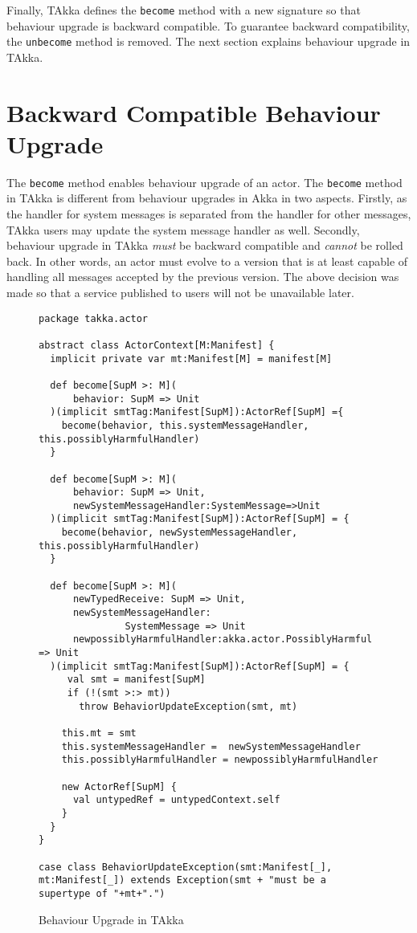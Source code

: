 Finally, TAkka defines the {\tt become} method with a new signature so that 
behaviour upgrade is backward compatible.  To guarantee backward 
compatibility, the {\tt unbecome} method is removed.  The next 
section explains behaviour upgrade in TAkka.



\section{Backward Compatible Behaviour Upgrade}
\label{hot_swapping}

The {\tt become} method enables behaviour upgrade of an 
actor.  The {\tt become} method in TAkka is different from behaviour 
upgrades in  Akka in two aspects.  Firstly, as the handler for system messages 
is separated from the handler for other messages, TAkka users may update the 
system message handler as well.  Secondly, behaviour upgrade in TAkka {\it must} be 
backward compatible and {\it cannot} be rolled back.  In other words, an actor 
must evolve to a version that is at least capable of handling all messages accepted
by the previous version.  The above decision was made so that a service published to 
users will not be unavailable later.  


\begin{figure}[p]
\begin{lstlisting}
package takka.actor

abstract class ActorContext[M:Manifest] {
  implicit private var mt:Manifest[M] = manifest[M]

  def become[SupM >: M](
      behavior: SupM => Unit
  )(implicit smtTag:Manifest[SupM]):ActorRef[SupM] ={
    become(behavior, this.systemMessageHandler, this.possiblyHarmfulHandler)   
  }
  
  def become[SupM >: M](
      behavior: SupM => Unit, 
      newSystemMessageHandler:SystemMessage=>Unit
  )(implicit smtTag:Manifest[SupM]):ActorRef[SupM] = {
    become(behavior, newSystemMessageHandler,  this.possiblyHarmfulHandler)   
  } 
  
  def become[SupM >: M](
      newTypedReceive: SupM => Unit,
      newSystemMessageHandler:
               SystemMessage => Unit
      newpossiblyHarmfulHandler:akka.actor.PossiblyHarmful => Unit
  )(implicit smtTag:Manifest[SupM]):ActorRef[SupM] = {
     val smt = manifest[SupM]
     if (!(smt >:> mt))
       throw BehaviorUpdateException(smt, mt)

    this.mt = smt
    this.systemMessageHandler =  newSystemMessageHandler
    this.possiblyHarmfulHandler = newpossiblyHarmfulHandler
    
    new ActorRef[SupM] {
      val untypedRef = untypedContext.self
    }
  }
}

case class BehaviorUpdateException(smt:Manifest[_], mt:Manifest[_]) extends Exception(smt + "must be a supertype of "+mt+".")
\end{lstlisting}
\caption{Behaviour Upgrade in TAkka}
\label{takka_become}
\end{figure}

